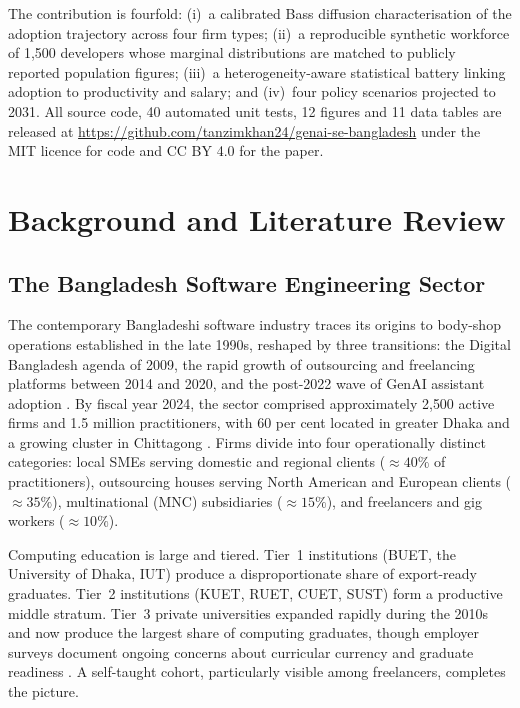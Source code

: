 \documentclass[11pt,a4paper]{article}
\begin{document}
The contribution is fourfold: (i)~a calibrated Bass diffusion
characterisation of the adoption trajectory across four firm types;
(ii)~a reproducible synthetic workforce of 1{,}500 developers whose
marginal distributions are matched to publicly reported population
figures; (iii)~a heterogeneity-aware statistical battery linking
adoption to productivity and salary; and (iv)~four policy scenarios
projected to 2031. All source code, 40 automated unit tests, 12
figures and 11 data tables are released at
\url{https://github.com/tanzimkhan24/genai-se-bangladesh} under the
MIT licence for code and CC BY 4.0 for the paper.

\section{Background and Literature Review}

\subsection{The Bangladesh Software Engineering Sector}

The contemporary Bangladeshi software industry traces its origins to
body-shop operations established in the late 1990s, reshaped by three
transitions: the Digital Bangladesh agenda of 2009, the rapid growth
of outsourcing and freelancing platforms between 2014 and 2020, and
the post-2022 wave of GenAI assistant adoption
\citep{LICTReport2023,WorldBank2024DigitalBD,KaramSiddiqueAlam2025}.
By fiscal year 2024, the sector comprised approximately 2{,}500 active
firms and 1.5 million practitioners, with 60 per cent located in
greater Dhaka and a growing cluster in Chittagong \citep{BBS2024LFS}.
Firms divide into four operationally distinct categories: local SMEs
serving domestic and regional clients ($\approx40\%$ of practitioners),
outsourcing houses serving North American and European clients
($\approx35\%$), multinational (MNC) subsidiaries ($\approx15\%$),
and freelancers and gig workers ($\approx10\%$).

Computing education is large and tiered. Tier~1 institutions (BUET,
the University of Dhaka, IUT) produce a disproportionate share of
export-ready graduates. Tier~2 institutions (KUET, RUET, CUET, SUST)
form a productive middle stratum. Tier~3 private universities
expanded rapidly during the 2010s and now produce the largest share
of computing graduates, though employer surveys document ongoing
concerns about curricular currency and graduate readiness
\citep{ChowdhuryRahman2025}. A self-taught cohort, particularly
visible among freelancers, completes the picture.
\end{document}
